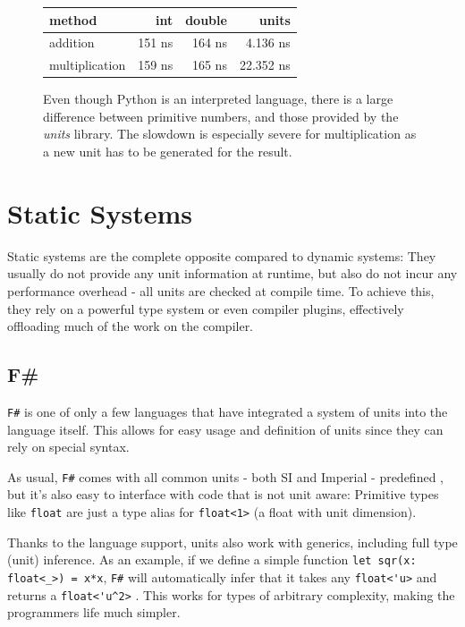 \documentclass[12pt,oneside,a4paper]{scrbook}
\begin{document}
\begin{figure}
\begin{tabular}{lrrr}
method          & int    & double  & units \\
\midrule
addition        & 151 ns &  164 ns    &    4.136 ns \\
multiplication  & 159 ns &  165 ns    &   22.352 ns
\end{tabular}
\caption{Even though Python is an interpreted language, there is a large difference between primitive numbers, and those provided by the \emph{units} library. The slowdown is especially severe for multiplication as a new unit has to be generated for the result.}
\label{bench:python_units}
\end{figure}



\section{Static Systems}
Static systems are the complete opposite compared to dynamic systems: They usually do not provide any unit information at runtime, but also do not incur any performance overhead - all units are checked at compile time. To achieve this, they rely on a powerful type system or even compiler plugins, effectively offloading much of the work on the compiler.

\subsection{F\#}

\verb/F#/ is one of only a few languages that have integrated a system of units into the language itself. This allows for easy usage and definition of units since they can rely on special syntax.
\citep{Kennedy08:1}

As usual, \verb/F#/ comes with all common units - both SI and Imperial - predefined \citep{Kennedy08:2}, but it's also easy to interface with code that is not unit aware: Primitive types like \verb/float/ are just a type alias for \verb/float<1>/ (a float with unit dimension).

Thanks to the language support, units also work with generics, including full type (unit) inference. As an example, if we define a simple function \verb/let sqr(x: float<_>) = x*x/, \verb/F#/ will automatically infer that it takes any \verb/float<'u>/ and returns a \verb/float<'u^2>/ \citep{Kennedy08:3}. This works for types of arbitrary complexity, making the programmers life much simpler.
\end{document}
